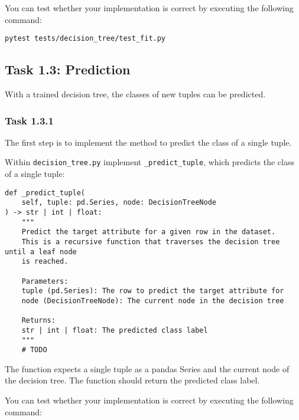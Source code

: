 \documentclass[
english,
smallborders
]{i6prcsht}
\begin{document}
You can test whether your implementation is correct by executing the following command:

\vspace*{0.3cm}

\begin{lstlisting}
pytest tests/decision_tree/test_fit.py
\end{lstlisting}

\vspace*{0.1cm}

\subsection*{Task 1.3: Prediction}

With a trained decision tree, the classes of new tuples can be predicted.

\subsubsection*{Task 1.3.1}

The first step is to implement the method to predict the class of a single tuple.

Within \texttt{decision\_tree.py} implement \texttt{\_predict\_tuple}, which predicts the class of a single tuple:

\vspace*{0.3cm}

\newpage

\begin{lstlisting}
def _predict_tuple(
	self, tuple: pd.Series, node: DecisionTreeNode
) -> str | int | float:
	"""
	Predict the target attribute for a given row in the dataset.
	This is a recursive function that traverses the decision tree until a leaf node
	is reached.

	Parameters:
	tuple (pd.Series): The row to predict the target attribute for
	node (DecisionTreeNode): The current node in the decision tree

	Returns:
	str | int | float: The predicted class label
	"""
	# TODO
\end{lstlisting}

\vspace*{0.1cm}

The function expects a single tuple as a pandas Series and the current node of the decision tree. The function should return the predicted class label.

You can test whether your implementation is correct by executing the following command:
\end{document}
